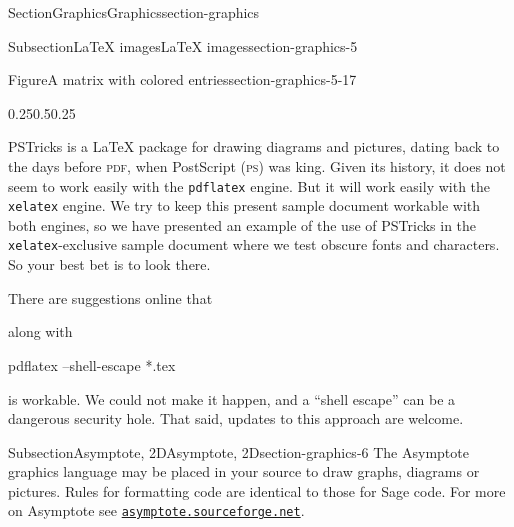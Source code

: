 \documentclass[twoside,10pt,]{article}
\newcommand{\mono}[1]{\texttt{#1}}
\newcommand{\initialism}[1]{\textsc{\MakeLowercase{#1}}}
\numberwithin{equation}{section}
\newcommand{\amp}{&}
\begin{document}
\begin{sectionptx}{Section}{Graphics}{}{Graphics}{}{}{section-graphics}
\begin{subsectionptx}{Subsection}{\LaTeX{} images}{}{\LaTeX{} images}{}{}{section-graphics-5}
\begin{figureptx}{Figure}{A matrix with colored entries}{section-graphics-5-17}{}%
\begin{image}{0.25}{0.5}{0.25}{}%
\resizebox{\linewidth}{!}{%
    \begin{tikzpicture}
    \node{
        $\begin{bNiceArray}{ccc|cc}[
        code-before={\cellcolor{green!72}{1-1,2-2,3-3}\cellcolor{teal!72}{1-2,2-3,3-4}\cellcolor{yellow!72}{1-3,2-4,3-5}}
        ]
        3 \amp 4 \amp 0 \amp 1 \amp 4 \\
        -2 \amp 3 \amp 1 \amp -2 \amp 3 \\
        0 \amp 2 \amp 1 \amp 0 \amp 2
        \end{bNiceArray}$
    };
\end{tikzpicture}%
}%
\end{image}%
\tcblower
\end{figureptx}%
PSTricks is a \LaTeX{} package for drawing diagrams and pictures, dating back to the days before \initialism{PDF}, when PostScript (\initialism{PS}) was king.  Given its history, it does not seem to work easily with the \mono{pdflatex} engine.  But it will work easily with the \mono{xelatex} engine.  We try to keep this present sample document workable with both engines, so we have presented an example of the use of PSTricks in the \mono{xelatex}-exclusive sample document where we test obscure fonts and characters.  So your best bet is to look there.%
\par
There are suggestions online that%
\begin{codedisplay}
\usepackage[pdf]{pstricks}
\end{codedisplay}
along with%
\begin{codedisplay}
pdflatex --shell-escape *.tex
\end{codedisplay}
is workable.  We could not make it happen, and a ``shell escape'' can be a dangerous security hole.  That said, updates to this approach are welcome.%
\end{subsectionptx}
%
%
\typeout{************************************************}
\typeout{************************************************}
%
\begin{subsectionptx}{Subsection}{Asymptote, 2D}{}{Asymptote, 2D}{}{}{section-graphics-6}
The Asymptote graphics language may be placed in your source to draw graphs, diagrams or pictures.  Rules for formatting code are identical to those for Sage code.  For more on Asymptote see \href{http://asymptote.sourceforge.net/}{\nolinkurl{asymptote.sourceforge.net}}.%

\end{subsectionptx}
\end{sectionptx}
\end{document}
